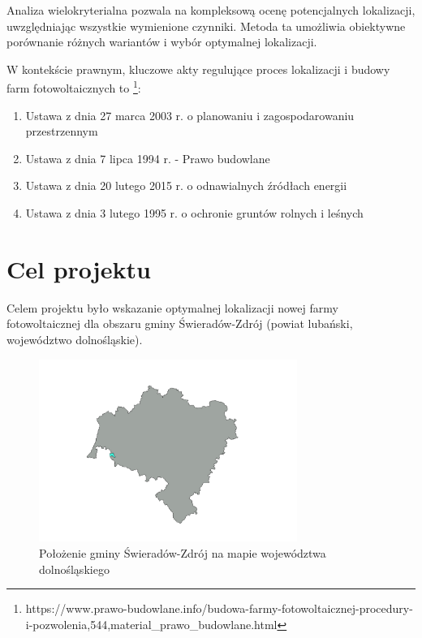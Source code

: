 \documentclass{article}
\begin{document}
Analiza wielokryterialna pozwala na kompleksową ocenę potencjalnych lokalizacji, uwzględniając wszystkie wymienione czynniki. Metoda ta umożliwia obiektywne porównanie różnych wariantów i wybór optymalnej lokalizacji.
\vspace{10pt}

W kontekście prawnym, kluczowe akty regulujące proces lokalizacji i budowy farm fotowoltaicznych to \footnote{https://www.prawo-budowlane.info/budowa-farmy-fotowoltaicznej-procedury-i-pozwolenia,544,material\_prawo\_budowlane.html}:

\begin{enumerate}[label=•]
    \item Ustawa z dnia 27 marca 2003 r. o planowaniu i zagospodarowaniu przestrzennym
    \item Ustawa z dnia 7 lipca 1994 r. - Prawo budowlane
    \item Ustawa z dnia 20 lutego 2015 r. o odnawialnych źródłach energii
    \item Ustawa z dnia 3 lutego 1995 r. o ochronie gruntów rolnych i leśnych
\end{enumerate}
\newpage

\section{Cel projektu}

Celem projektu było wskazanie optymalnej lokalizacji nowej farmy fotowoltaicznej dla obszaru gminy Świeradów-Zdrój (powiat lubański, województwo dolnośląskie).

\begin{figure}[H]
    \centering
    \includegraphics[width=0.75\textwidth]{img/swieradow.png}
    \caption{Położenie gminy Świeradów-Zdrój na mapie województwa dolnośląskiego}
\end{figure}
\newpage
\end{document}

